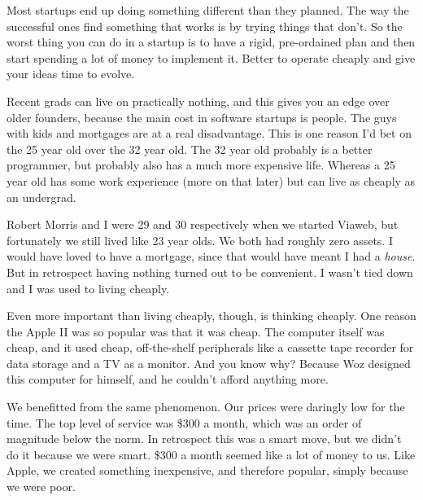 Most startups end up
                    doing something different than they planned. The way the
                    successful ones find something that works is by trying
                    things that don't. So the worst thing you can do in a
                    startup is to have a rigid, pre-ordained plan and then start
                    spending a lot of money to implement it. Better to operate
                    cheaply and give your ideas time to evolve.

Recent
                    grads can live on practically nothing, and this gives you an
                    edge over older founders, because the main cost in software
                    startups is people. The guys with kids and mortgages are at
                    a real disadvantage. This is one reason I'd bet on the 25
                    year old over the 32 year old. The 32 year old probably is a
                    better programmer, but probably also has a much more
                    expensive life. Whereas a 25 year old has some work
                    experience (more on that later) but can live as cheaply as
                    an undergrad.

Robert Morris and I were 29 and 30
                    respectively when we started Viaweb, but fortunately we
                    still lived like 23 year olds. We both had roughly zero
                    assets. I would have loved to have a mortgage, since that
                    would have meant I had a \emph{house}. But in retrospect
                    having nothing turned out to be convenient. I wasn't tied
                    down and I was used to living cheaply.

Even more
                    important than living cheaply, though, is thinking cheaply.
                    One reason the Apple II was so popular was that it was
                    cheap. The computer itself was cheap, and it used cheap,
                    off-the-shelf peripherals like a cassette tape recorder for
                    data storage and a TV as a monitor. And you know why?
                    Because Woz designed this computer for himself, and he
                    couldn't afford anything more.

We benefitted from
                    the same phenomenon. Our prices were daringly low for the
                    time. The top level of service was \$300 a month, which was
                    an order of magnitude below the norm. In retrospect this was
                    a smart move, but we didn't do it because we were smart.
                    \$300 a month seemed like a lot of money to us. Like Apple,
                    we created something inexpensive, and therefore popular,
                    simply because we were poor.

